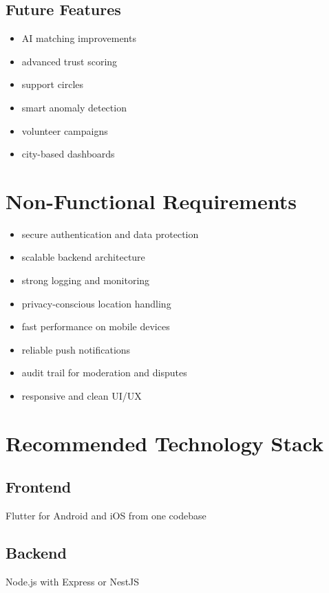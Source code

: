 \documentclass[11pt]{article}
\begin{document}
\subsection{Future Features}
\begin{itemize}[leftmargin=1.5em]
    \item AI matching improvements
    \item advanced trust scoring
    \item support circles
    \item smart anomaly detection
    \item volunteer campaigns
    \item city-based dashboards
\end{itemize}

\section{Non-Functional Requirements}

\begin{itemize}[leftmargin=1.5em]
    \item secure authentication and data protection
    \item scalable backend architecture
    \item strong logging and monitoring
    \item privacy-conscious location handling
    \item fast performance on mobile devices
    \item reliable push notifications
    \item audit trail for moderation and disputes
    \item responsive and clean UI/UX
\end{itemize}

\section{Recommended Technology Stack}

\subsection{Frontend}
Flutter for Android and iOS from one codebase

\subsection{Backend}
Node.js with Express or NestJS
\end{document}
